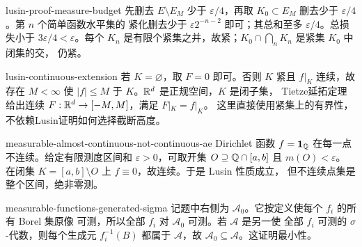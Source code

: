 \begin{solution}{lusin-proof-measure-budget}
先删去 $E\setminus E_M$ 少于 $\varepsilon/4$，再取
$K_0\subset E_M$ 删去少于 $\varepsilon/4$。第 $n$ 个简单函数水平集的
紧化删去少于 $\varepsilon2^{-n-2}$ 即可；其总和至多
$\varepsilon/4$。总损失小于 $3\varepsilon/4<\varepsilon$。每个 $K_n$
是有限个紧集之并，故紧；$K_0\cap\bigcap_nK_n$ 是紧集 $K_0$ 中闭集的交，
仍紧。
\end{solution}

\begin{solution}{lusin-continuous-extension}
若 $K=\varnothing$，取 $F=0$ 即可。否则 $K$ 紧且 $f|_K$ 连续，故存在
$M<\infty$ 使 $|f|\le M$ 于 $K$。$\mathbb{R}^d$ 是正规空间，$K$ 是闭子集，
Tietze延拓定理给出连续 $F:\mathbb{R}^d\to[-M,M]$，满足 $F|_K=f|_K$。
这里直接使用紧集上的有界性，不依赖Lusin证明如何选择截断高度。
\end{solution}

\begin{solution}{measurable-almost-continuous-not-continuous-ae}
Dirichlet 函数 $f=\mathbf1_{\mathbb{Q}}$ 在每一点不连续。给定有限测度区间和
$\varepsilon>0$，可取开集 $O\supseteq\mathbb{Q}\cap[a,b]$ 且 $m(O)<\varepsilon$。
在闭集 $K=[a,b]\setminus O$ 上 $f\equiv0$，故连续。于是 Lusin 性质成立，
但不连续点集是整个区间，绝非零测。
\end{solution}

\begin{solution}{measurable-functions-generated-sigma}
记题中右侧为 $\mathcal A_0$。它按定义使每个 $f_i$ 的所有 Borel 集原像
可测，所以全部 $f_i$ 对 $\mathcal A_0$ 可测。若 $\mathcal A$ 是另一使
全部 $f_i$ 可测的 $\sigma$-代数，则每个生成元
$f_i^{-1}(B)$ 都属于 $\mathcal A$，故
$\mathcal A_0\subseteq\mathcal A$。这证明最小性。
\end{solution}
